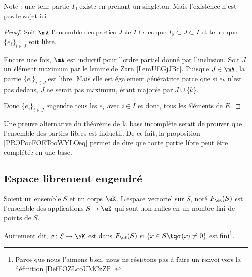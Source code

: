 Note : une telle partie \( I_0\) existe en prenant un singleton. Mais l'existence n'est pas le sujet ici.

\begin{proof}
	Soit \( \mA\) l'ensemble des parties \( J\) de \( I\) telles que \( I_0\subset J\subset I\) et telles que \( \{ e_i \}_{i\in J}\) soit libre.

	Encore une fois, \( \mA\) est inductif pour l'ordre partiel donné par l'inclusion. Soit \( J\) un élément maximum par le lemme de Zorn \ref{LemUEGjJBc}. Puisque \( J\in\mA\), la partie \( \{ e_i \}_{i\in J}\) est libre. Mais elle est également génératrice parce que si \( e_k\) n'est pas dedans, \( J\) ne serait pas maximum, étant majorée par \( J\cup\{ k \}\).

	Donc \( \{ e_i \}_{i\in J}\) engendre tous les \( e_i\) avec \( i\in I\) et donc, tous les éléments de \( E\).
\end{proof}

\begin{normaltext}        \label{NORMooREVQooEFJWta}
	Une preuve alternative du théorème de la base incomplète serait de prouver que l'ensemble des parties libres est inductif. De ce fait, la proposition \ref{PROPooFOETooWYLOeq} permet de dire que toute partie libre peut être complétée en une base.
\end{normaltext}

\subsection{Espace librement engendré}

\begin{definition}       \label{DEFooCPNIooNxsYMY}
	Soient un ensemble \( S\) et un corps \(\eK \). L'espace vectoriel  sur \( S\), noté \( F_{\eK}(S)\) est l'ensemble des applications \( S\to \eK\) qui sont non-nulles en un nombre fini de points de \( S\).

	Autrement dit, \( \sigma\colon S\to \eK\) est dans \( F_{\eK}(S) \) si \( \{ x\in S\tq \sigma(x)\neq 0 \}\) est fini\footnote{Parce que nous l'aimons bien, nous ne résistons pas à faire un renvoi vers la définition \ref{DefEOZLooUMCzZR}.}.
\end{definition}

